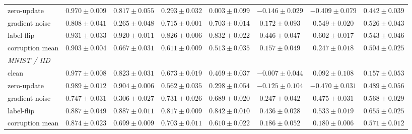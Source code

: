\documentclass[letterpaper]{article} %
\theoremstyle{plain}
\begin{document}
\begin{table}[t]
\begin{tabular}{lccccccc}
zero-update & $0.970\pm0.009$ & $0.817\pm0.055$ & $0.293\pm0.032$ & $0.003\pm0.099$ & $-0.146\pm0.029$ & $-0.409\pm0.079$ & $0.442\pm0.039$ \\
gradient noise & $0.808\pm0.041$ & $0.265\pm0.048$ & $0.715\pm0.001$ & $0.703\pm0.014$ & $0.172\pm0.093$ & $0.549\pm0.020$ & $0.526\pm0.043$ \\
label-flip & $0.931\pm0.033$ & $0.920\pm0.011$ & $0.826\pm0.006$ & $0.832\pm0.022$ & $0.446\pm0.047$ & $0.602\pm0.017$ & $0.543\pm0.046$ \\
corruption mean & $0.903\pm0.004$ & $0.667\pm0.031$ & $0.611\pm0.009$ & $0.513\pm0.035$ & $0.157\pm0.049$ & $0.247\pm0.018$ & $0.504\pm0.025$ \\
\hline
\multicolumn{8}{l}{\emph{MNIST / IID}} \\
clean & $0.977\pm0.008$ & $0.823\pm0.031$ & $0.673\pm0.019$ & $0.469\pm0.037$ & $-0.007\pm0.044$ & $0.092\pm0.108$ & $0.157\pm0.053$ \\
zero-update & $0.989\pm0.012$ & $0.904\pm0.006$ & $0.562\pm0.035$ & $0.298\pm0.054$ & $-0.125\pm0.104$ & $-0.470\pm0.031$ & $0.489\pm0.056$ \\
gradient noise & $0.747\pm0.031$ & $0.306\pm0.027$ & $0.731\pm0.026$ & $0.689\pm0.020$ & $0.247\pm0.042$ & $0.475\pm0.031$ & $0.568\pm0.029$ \\
label-flip & $0.887\pm0.049$ & $0.887\pm0.011$ & $0.817\pm0.009$ & $0.842\pm0.010$ & $0.436\pm0.028$ & $0.533\pm0.019$ & $0.655\pm0.025$ \\
corruption mean & $0.874\pm0.023$ & $0.699\pm0.009$ & $0.703\pm0.011$ & $0.610\pm0.022$ & $0.186\pm0.052$ & $0.180\pm0.006$ & $0.571\pm0.012$ \\
\hline
\end{tabular}
\end{table}
\end{document}
